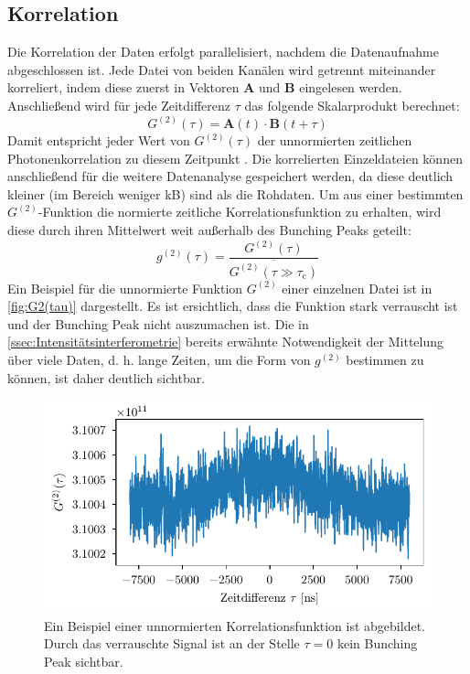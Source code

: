 \subsection{Korrelation}
\label{ssec:Korrelation}
Die Korrelation der Daten erfolgt parallelisiert, nachdem die Datenaufnahme abgeschlossen ist. 
Jede Datei von beiden Kanälen wird getrennt miteinander korreliert, indem diese zuerst in Vektoren $\mathbf{A}$ und $\mathbf{B}$ eingelesen werden. 
Anschließend wird für jede Zeitdifferenz $\tau$ das folgende Skalarprodukt berechnet: 
\begin{equation}
    G^{(2)}(\tau) = \mathbf{A}(t)\cdot\mathbf{B}(t+\tau)
    \label{eq:korrelation}
\end{equation}
Damit entspricht jeder Wert von $G^{(2)}(\tau)$ der unnormierten zeitlichen Photonenkorrelation zu diesem Zeitpunkt \cite{zmijaOpticalIntensityInterferometry2021}. 
Die korrelierten Einzeldateien können anschließend für die weitere Datenanalyse gespeichert werden, da diese deutlich kleiner (im Bereich weniger kB) sind als die Rohdaten. 
Um aus einer bestimmten $G^{(2)}$-Funktion die normierte zeitliche Korrelationsfunktion zu erhalten, wird diese durch ihren Mittelwert weit außerhalb des Bunching Peaks geteilt:
\begin{equation}
    g^{(2)}(\tau) = \frac{G^{(2)}(\tau)}{\overline{G^{(2)}(\tau\gg\tau_{\mathrm{c}})}}
    \label{eq:G2 normalisierung}
\end{equation}
Ein Beispiel für die unnormierte Funktion $G^{(2)}$ einer einzelnen Datei ist in \autoref{fig:G2(tau)} dargestellt. 
Es ist ersichtlich, dass die Funktion stark verrauscht ist und der Bunching Peak nicht auszumachen ist. 
Die in \autoref{ssec:Intensitätsinterferometrie} bereits erwähnte Notwendigkeit der Mittelung über viele Daten, d. h. lange Zeiten, um die Form von $g^{(2)}$ bestimmen zu können, ist daher deutlich sichtbar. 
\begin{figure}[h]
    \centering
    \includegraphics{images/Datenaufnahme/G2.pdf}
    \caption{Ein Beispiel einer unnormierten Korrelationsfunktion ist abgebildet. Durch das verrauschte Signal ist an der Stelle $\tau=0$ kein Bunching Peak sichtbar.}
    \label{fig:G2(tau)}
\end{figure}

